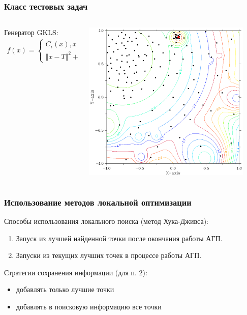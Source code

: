 \documentclass[aspectratio=1610]{beamer}
\begin{document}
\begin{frame}
  \frametitle{Класс тестовых задач}
  \begin{columns}
    \begin{column}{0.5\textwidth}
      Генератор GKLS:
      \begin{displaymath}
        \begin{matrix}
          f(x)=
          \left\{
          \begin{matrix}
          C_i(x), x \in S_i, i\in 2,\dots ,m \\
          \Vert x-T \Vert^2 + t, x\not\in S_2,\dots,S_m
          \end{matrix} \right.
        \end{matrix}
      \end{displaymath}
    \end{column}
    \begin{column}{0.5\textwidth}
      \centerline{\includegraphics[width=0.9\textwidth]{gkls_color.png}}
    \end{column}
  \end{columns}
\end{frame}

\begin{frame}
\frametitle{Использование методов локальной оптимизации}
Способы использования локального поиска (метод Хука-Дживса):\
\begin{enumerate}
  \item Запуск из лучшей найденной точки после окончания работы АГП.
  \item Запуски из текущих лучших точек в процессе работы АГП.
\end{enumerate}
\bigbreak
Стратегии сохранения информации (для п. 2):
\begin{itemize}
  \item добавлять только лучшие точки
  \item добавлять в поисковую информацию все точки
\end{itemize}
\end{frame}
\end{document}
